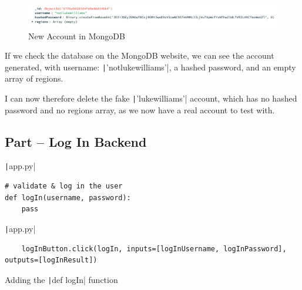 \documentclass[12pt]{report}
\newcommand{\pil}[1]{\protect\texttt|#1|}
\begin{document}
\begin{figure}[H]
\centering
\includegraphics[width=14cm]{ss15.10.png}
\caption{New Account in MongoDB}\label{fig:ss15.10}
\end{figure}

If we check the database on the MongoDB website, we can see the account generated, with username: \pil{'notlukewilliams'}, a hashed password, and an empty array of regions.

\begin{center}
\end{center}

I can now therefore delete the fake \pil{'lukewilliams'} account, which has no hashed password and no regions array, as we now have a real account to test with.

\subsection{Part \theparts{} -- Log In Backend}

\begin{listing}[H]
\pil{app.py}
\begin{verbatim}
# validate & log in the user
def logIn(username, password):
    pass
\end{verbatim}
\pil{app.py}
\begin{verbatim}
    logInButton.click(logIn, inputs=[logInUsername, logInPassword], outputs=[logInResult])
\end{verbatim}
\caption{Adding the \pil{def logIn} function}\label{cs:logIn}
\end{listing}
\end{document}
